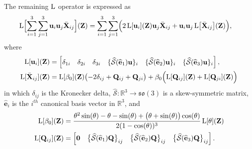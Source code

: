 The remaining $\operatorname{L}$ operator is expressed as
\begin{align}
    \operatorname{L}\Bigl[\sum_{i=1}^{3}\sum_{j=1}^{3}\mathbf{u}_i\mathbf{u}_j\bar{\mathbf{X}}_{ij}\Bigr](\mathbf{Z}) =  \sum_{i=1}^{3}\sum_{j=1}^{3}& \Bigl(2\operatorname{L}[\mathbf{u}_{i}](\mathbf{Z})\mathbf{u}_{j}\bar{\mathbf{X}}_{ij}
     +\mathbf{u}_{i}\mathbf{u}_{j}\operatorname{L}\bigl[\bar{\mathbf{X}}_{ij}\bigr](\mathbf{Z})\Bigr),
\end{align}
where
\begin{align}
    \operatorname{L}[\mathbf{u}_{i}](\mathbf{Z}) &= \begin{bmatrix}
        \delta_{1i} & \delta_{2i} & \delta_{3i} & \{\widehat{\mathcal{S}}(\widehat{\mathbf{e}}_1)\mathbf{u}\}_i & \{\widehat{\mathcal{S}}(\widehat{\mathbf{e}}_2)\mathbf{u}\}_i & \{\widehat{\mathcal{S}}(\widehat{\mathbf{e}}_3)\mathbf{u}\}_i 
    \end{bmatrix},\label{eq:explicit-EE-dista-SE3-component-Lui}\\
    \operatorname{L}[\bar{\mathbf{X}}_{ij}](\mathbf{Z}) &= \operatorname{L}[\beta_0](\mathbf{Z})\bigl(-2\delta_{ij}+ \mathbf{Q}_{ij} + \mathbf{Q}_{ji}\bigr) + \beta_0\Bigl(\operatorname{L}[\mathbf{Q}_{ij}](\mathbf{Z}) + \operatorname{L}[\mathbf{Q}_{ji}](\mathbf{Z})\Bigr) \label{eq:explicit-EE-dista-SE3-component-Xij}
\end{align}
in which $\delta_{ij}$ is the Kronecker delta, $\widehat{\mathcal{S}}:\mathbb{R}^3\to\mathfrak{so}(3)$ is a skew-symmetric matrix, $\widehat{\mathbf{e}}_i$ is the $i^{th}$ canonical basis vector in $\mathbb{R}^3$, and
\begin{align}
    \operatorname{L}[\beta_0](\mathbf{Z}) &= \frac{\theta^2\sin(\theta) - \theta - \sin(\theta) + \bigl(\theta + \sin(\theta)\bigr) \cos(\theta)}{2 (1 - \cos(\theta))^3} \operatorname{L}[\theta](\mathbf{Z}) \label{eq:explicit-EE-dista-SE3-component-Lbeta}\\
    \operatorname{L}[\mathbf{Q}_{ij}](\mathbf{Z}) &= \begin{bmatrix}
        \mathbf{0} & \bigl\{\widehat{\mathcal{S}}(\widehat{\mathbf{e}}_1)\mathbf{Q}\bigr\}_{ij} & \bigl\{\widehat{\mathcal{S}}(\widehat{\mathbf{e}}_2)\mathbf{Q}\bigr\}_{ij} & \bigl\{\widehat{\mathcal{S}}(\widehat{\mathbf{e}}_3)\mathbf{Q}\bigr\}_{ij}
    \end{bmatrix}. \label{eq:explicit-EE-dista-SE3-component-LQij}
\end{align}

